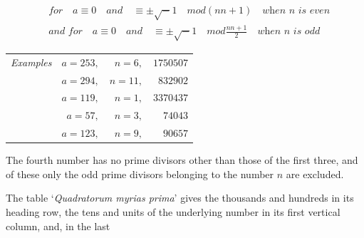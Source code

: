 \[
\begin{aligned}
&\textit{for}\quad a\equiv0\quad\textit{and}\quad\equiv\pm\surd-1\quad mod(nn+1)\quad\textit{when }n\textit{ is even}\\
&\textit{and for}\quad a\equiv0\quad\textit{and}\quad\equiv\pm\surd-1\quad mod\frac{nn+1}{2}\quad\textit{when }n\textit{ is odd}
\end{aligned}
\]
\begin{center}
\begin{tabular}{lrrr}
\textit{Examples} & $a=253,$ & $n=6,$ & $1750507$\\
 & $a=294,$ & $n=11,$ & $832902$\\
 & $a=119,$ & $n=1,$ & $3370437$\\
 & $a=57,$ & $n=3,$ & $74043$\\
 & $a=123,$ & $n=9,$ & $90657$
\end{tabular}
\end{center}
\par The fourth number has no prime divisors other than those of the first three, and of these only the odd prime divisors belonging to the number $n$ are excluded.
\par The table ‘\textit{Quadratorum myrias prima}’ gives the thousands and hundreds in its heading row, the tens and units of the underlying number in its first vertical column, and, in the last
